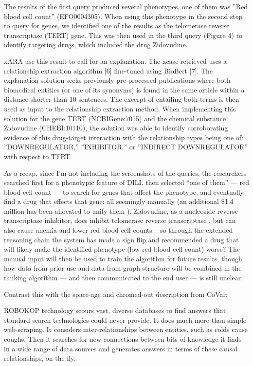 \documentclass[11pt]{article}
\begin{document}
\begin{multicols}{2}
\begin{leftbar}
The results of the first query produced several phenotypes, one of them
was ''Red blood cell count'' (EFO0004305). When using this phenotype in
the second step to query for genes, we identified one of the results as
the telomerase reverse transcriptase (TERT) gene. This was then used in
the third query (Figure 4) to identify targeting drugs, which included
the drug Zidovudine.

xARA use this result to call for an explanation. The xcase retrieved
uses a relationship extraction algorithm {[}6{]} fine-tuned using
BioBert {[}7{]}. The explanation solution seeks previously pre-processed
publications where both biomedical entities (or one of its synonyms) is
found in the same article within a distance shorter than 10 sentences.
The excerpt of entailing both terms is then used as input to the
relationship extraction method. When implementing this solution for the
gene TERT (NCBIGene:7015) and the chemical substance Zidovudine
(CHEBI:10110), the solution was able to identify corroborating evidence
of this drug-target interaction with the relationship types being one
of: ''DOWNREGULATOR,'' ''INHIBITOR,'' or ''INDIRECT DOWNREGULATOR'' with
respect to TERT. \cite{goelExplanationContainerCaseBased2021} 
\end{leftbar}

As a recap, since I'm not including the screenshots of the queries, the
researchers searched first for a phenotypic feature of DILI, then
selected ``one of them'' --- red blood cell count --- to search for
genes that affect the phenotype, and eventually find a drug that effects
that gene: all seemingly manually (an additional \$1.4 million has been
allocated to unify them \cite{haendelCommonDialectInfrastructure2021} ). Zidovudine, as a nucleoside reverse transcriptase inhibitor, does
inhibit telomerase reverse transcriptase \cite{hukezalieVitroExVivo2012} , but can also cause anemia and lower red
blood cell counts \cite{ZidovudinePatientNIH}  -- so through the
extended reasoning chain the system has made a sign flip and recommended
a drug that will likely make the identified phenotype (low red blood
cell count) worse? The manual input will then be used to train the
algorithm for future results, though how data from prior use and data
from graph structure will be combined in the ranking algorithm --- and
then communicated to the end user --- is still unclear.

Contrast this with the space-age and chromed-out description from CoVar:

\begin{leftbar}
ROBOKOP technology scours vast, diverse databases to find answers that
standard search technologies could never provide. It does much more than
simple web-scraping. It considers inter-relationships between entities,
such as colds cause coughs. Then it searches for new connections between
bits of knowledge it finds in a wide range of data sources and generates
answers in terms of these causal relationships, on-the-fly.


\end{leftbar}
\end{multicols}
\end{document}
